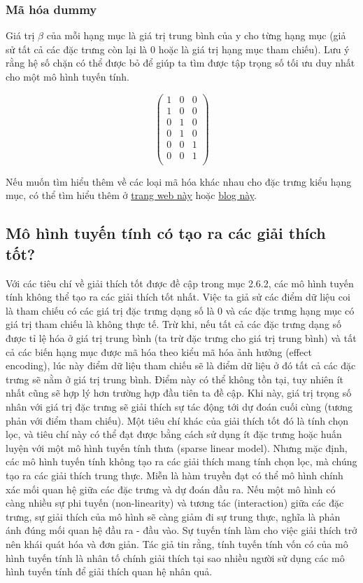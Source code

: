 \subsubsection{Mã hóa dummy}
Giá trị $\beta$ của mỗi hạng mục là giá trị trung bình của y cho từng hạng mục (giả sử tất cả các đặc trưng còn lại là 0 hoặc là giá trị hạng mục tham chiếu). Lưu ý rằng hệ số chặn có thể được bỏ để giúp ta tìm được tập trọng số tối ưu duy nhất cho một mô hình tuyến tính.

$$\begin{pmatrix}1&0&0\\1&0&0\\0&1&0\\0&1&0\\0&0&1\\0&0&1\\\end{pmatrix}$$

Nếu muốn tìm hiểu thêm về các loại mã hóa khác nhau cho đặc trưng kiểu hạng mục, có thể tìm hiểu thêm ở \href{http://stats.idre.ucla.edu/r/library/r-library-contrast-coding-systems-for-categorical-variables/}{trang web này} hoặc \href{http://heidiseibold.github.io/page7/}{blog này}.

\subsection{Mô hình tuyến tính có tạo ra các giải thích tốt?}
Với các tiêu chí về giải thích tốt được đề cập trong mục 2.6.2, các mô hình tuyến tính không thể tạo ra các giải thích tốt nhất. Việc ta giả sử các điểm dữ liệu coi là tham chiếu có các giá trị đặc trưng dạng số là 0 và các đặc trưng hạng mục có giá trị tham chiếu là không thực tế. Trừ khi, nếu tất cả các đặc trưng dạng số được tỉ lệ hóa ở giá trị trung bình (ta trừ đặc trưng cho giá trị trung bình) và tất cả các biến hạng mục được mã hóa theo kiểu mã hóa ảnh hưởng (effect encoding), lúc này điểm dữ liệu tham chiếu sẽ là điểm dữ liệu ở đó tất cả các đặc trưng sẽ nằm ở giá trị trung bình. Điểm này có thể không tồn tại, tuy nhiên ít nhất cũng sẽ hợp lý hơn trường hợp đầu tiên ta đề cập. Khi này, giá trị trọng số nhân với giá trị đặc trưng sẽ giải thích sự tác động tới dự đoán cuối cùng (tương phản với điểm tham chiếu). Một tiêu chí khác của giải thích tốt đó là tính chọn lọc, và tiêu chí này có thể đạt được bằng cách sử dụng ít đặc trưng hoặc huấn luyện với một mô hình tuyến tính thưa (sparse linear model). Nhưng mặc định, các mô hình tuyến tính không tạo ra các giải thích mang tính chọn lọc, mà chúng tạo ra các giải thích trung thực. Miễn là hàm truyền đạt có thể mô hình chính xác mối quan hệ giữa các đặc trưng và dự đoán đầu ra. Nếu một mô hình có càng nhiều sự phi tuyến (non-linearity) và tương tác (interaction) giữa các đặc trưng, sự giải thích của mô hình sẽ càng giảm đi sự trung thực, nghĩa là phản ánh đúng mối quan hệ đầu ra - đầu vào. Sự tuyến tính làm cho việc giải thích trở nên khái quát hóa và đơn giản. Tác giả tin rằng, tính tuyến tính vốn có của mô hình tuyến tính là nhân tố chính giải thích tại sao nhiều người sử dụng các mô hình tuyến tính để giải thích quan hệ nhân quả.

